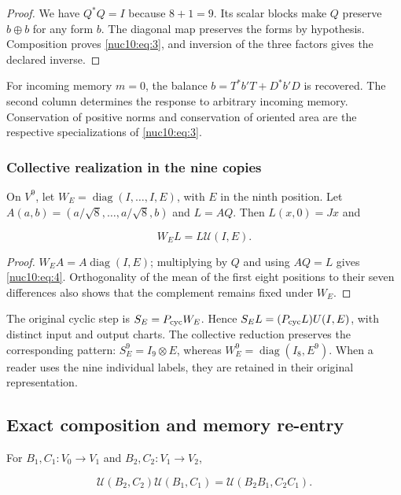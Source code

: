 \begin{proof}
We have \(Q^*Q=I\) because \(8+1=9\). Its scalar blocks make \(Q\) preserve \(b\oplus b\) for any form \(b\). The diagonal map preserves the forms by hypothesis. Composition proves \eqref{nuc10:eq:3}, and inversion of the three factors gives the declared inverse.
\end{proof}

For incoming memory \(m=0\), the balance \(b=T^*b'T+D^*b'D\) is recovered. The second column determines the response to arbitrary incoming memory. Conservation of positive norms and conservation of oriented area are the respective specializations of \eqref{nuc10:eq:3}.

\subsubsection{Collective realization in the nine copies}

On \(V^9\), let \(W_E=\operatorname{diag}(I,\ldots,I,E)\), with \(E\) in the ninth position. Let \(A(a,b)=(a/\sqrt8,\ldots,a/\sqrt8,b)\) and \(L=AQ\). Then \(L(x,0)=Jx\) and

\begin{equation}
W_E L=L\mathcal U(I,E).
\label{nuc10:eq:4}
\end{equation}

\begin{proof}
\(W_EA=A\operatorname{diag}(I,E)\); multiplying by \(Q\) and using \(AQ=L\) gives \eqref{nuc10:eq:4}. Orthogonality of the mean of the first eight positions to their seven differences also shows that the complement remains fixed under \(W_E\).
\end{proof}

The original cyclic step is \(S_E=P_{\rm cyc}W_E\). Hence \(S_EL=(P_{\rm cyc}L)U(I,E)\), with distinct input and output charts. The collective reduction preserves the corresponding pattern: \(S_E^9=I_9\otimes E\), whereas \(W_E^9=\operatorname{diag}(I_8,E^9)\). When a reader uses the nine individual labels, they are retained in their original representation.

\subsection{Exact composition and memory re-entry}

For \(B_1,C_1:V_0\to V_1\) and \(B_2,C_2:V_1\to V_2\),

\begin{equation}
\boxed{\mathcal U(B_2,C_2)\mathcal U(B_1,C_1)
=\mathcal U(B_2B_1,C_2C_1).}
\label{nuc10:eq:5}
\end{equation}

